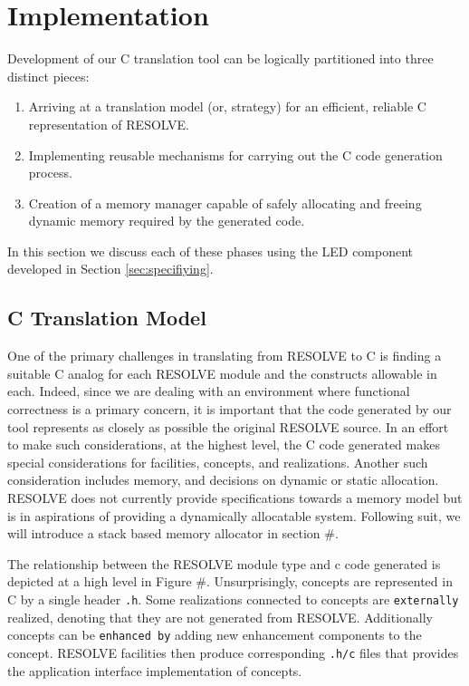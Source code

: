 \documentclass{sig-alternate}
\begin{document}
\section{Implementation}
Development of our C translation tool can be logically partitioned into three distinct pieces: 
\begin{enumerate}
\item Arriving at a translation model (or, strategy) for an efficient, reliable C representation of RESOLVE.
\item Implementing reusable mechanisms for carrying out the C code generation process.
\item Creation of a memory manager capable of safely allocating and freeing dynamic memory required by the generated code.
\end{enumerate}
In this section we discuss each of these phases using the LED component developed in Section \ref{sec:specifiying}.

\subsection{C Translation Model}
One of the primary challenges in translating from RESOLVE to C is finding a suitable C analog for each RESOLVE module and the constructs allowable in each. Indeed, since we are dealing with an environment where functional correctness is a primary concern, it is important that the code generated by our tool represents as closely as possible the original RESOLVE source. In an effort to make such considerations, at the highest level, the C code generated makes special considerations for facilities, concepts, and realizations. Another such consideration includes memory, and decisions on dynamic or static allocation. RESOLVE does not currently provide specifications towards a memory model but is in aspirations of providing a dynamically allocatable system. Following suit, we will introduce a stack based memory allocator in section \#.

The relationship between the RESOLVE module type and c code generated is depicted at a high level in Figure \#. Unsurprisingly, concepts are represented in C by a single header \texttt{.h}. Some realizations connected to concepts are \texttt{externally} realized, denoting that they are not generated from RESOLVE. Additionally concepts can be \texttt{enhanced by} adding new enhancement components to the concept. RESOLVE facilities then produce corresponding \texttt{.h/c} files that provides the application interface implementation of concepts.
\end{document}
